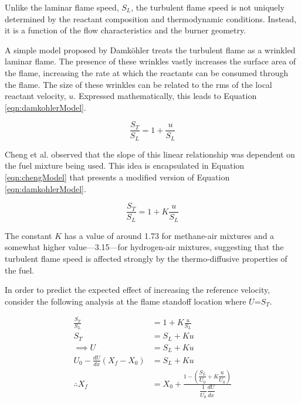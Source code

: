 Unlike the laminar flame speed, \(S_L\), the turbulent flame speed is not uniquely determined by the reactant composition and thermodynamic conditions.
Instead, it is a function of the flow characteristics and the burner geometry.

A simple model proposed by Damk{\"o}hler\cite{1940-damkohler} treats the turbulent flame as a wrinkled laminar flame.
The presence of these wrinkles vastly increases the surface area of the flame, increasing the rate at which the reactants can be consumed through the flame.
The size of these wrinkles can be related to the rms of the local reactant velocity, \(u\).
Expressed mathematically, this leads to Equation \ref{eqn:damkohlerModel}.

\begin{equation}
\frac{ S_T }{ S_L } = 1 + \frac{ u }{ S_L }
\label{eqn:damkohlerModel}
\end{equation}

Cheng et al.\cite{2002-cheng,2009-cheng,2010-littlejohn} observed that the slope of this linear relationship was dependent on the fuel mixture being used.
This idea is encapsulated in Equation \ref{eqn:chengModel} that presents a modified version of Equation \ref{eqn:damkohlerModel}.

\begin{equation}
\frac{ S_T }{ S_L } = 1 + K \frac{ u }{ S_L }
\label{eqn:chengModel}
\end{equation}

The constant \(K\) has a value of around 1.73 for methane-air mixtures and a somewhat higher value---3.15---for hydrogen-air mixtures,\cite{2009-cheng} suggesting that the turbulent flame speed is affected strongly by the thermo-diffusive properties of the fuel.

In order to predict the expected effect of increasing the reference velocity, consider the following analysis at the flame standoff location where \(U\)=\(S_T\).

\begin{align}
\frac{ S_T }{ S_L } &= 1 + K \frac{ u }{ S_L } \nonumber \\
S_T &= S_L + K u \nonumber \\
\implies U &= S_L + K u \nonumber \\
U_0 - \frac{ dU }{ dx } ( X_f - X_0 ) &= S_L + K u \nonumber \\
  \therefore X_f &= X_0 + \frac{1 - \left( \dfrac{ S_L }{ U_0 } + K\dfrac{ u }{ U_0 } \right) }{ \dfrac{ 1 }{ U_0 } \dfrac{ dU }{ dx } }
\label{eqn:flameImmobility}
\end{align}

